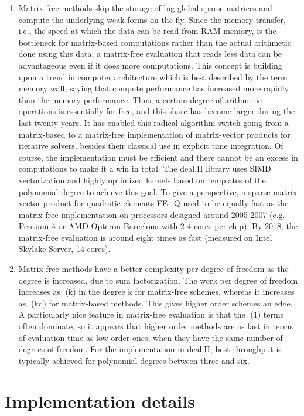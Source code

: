 \documentclass[12pt]{article}
\begin{document}
\begin{enumerate}
\item Matrix-free methods skip the storage of big global sparse matrices and compute the underlying weak forms on the fly. Since the memory transfer, i.e., the speed at which the data can be read from RAM memory, is the bottleneck for matrix-based computations rather than the actual arithmetic done using this data, a matrix-free evaluation that reads less data can be advantageous even if it does more computations. This concept is building upon a trend in computer architecture which is best described by the term memory wall, saying that compute performance has increased more rapidly than the memory performance. Thus, a certain degree of arithmetic operations is essentially for free, and this share has become larger during the last twenty years. It has enabled this radical algorithm switch going from a matrix-based to a matrix-free implementation of matrix-vector products for iterative solvers, besides their classical use in explicit time integration. Of course, the implementation must be efficient and there cannot be an excess in computations to make it a win in total. The deal.II library uses SIMD vectorization and highly optimized kernels based on templates of the polynomial degree to achieve this goal. To give a perspective, a sparse matrix-vector product for quadratic elements FE\_Q used to be equally fast as the matrix-free implementation on processors designed around 2005-2007 (e.g. Pentium 4 or AMD Opteron Barcelona with 2-4 cores per chip). By 2018, the matrix-free evaluation is around eight times as fast (measured on Intel Skylake Server, 14 cores).
\item Matrix-free methods have a better complexity per degree of freedom as the degree is increased, due to sum factorization. The work per degree of freedom increases as (k) in the degree k for matrix-free schemes, whereas it increases as (kd) for matrix-based methods. This gives higher order schemes an edge. A particularly nice feature in matrix-free evaluation is that the (1) terms often dominate, so it appears that higher order methods are as fast in terms of evaluation time as low order ones, when they have the same number of degrees of freedom. For the implementation in deal.II, best throughput is typically achieved for polynomial degrees between three and six.
\end{enumerate}

\section{Implementation details}
\end{document}
